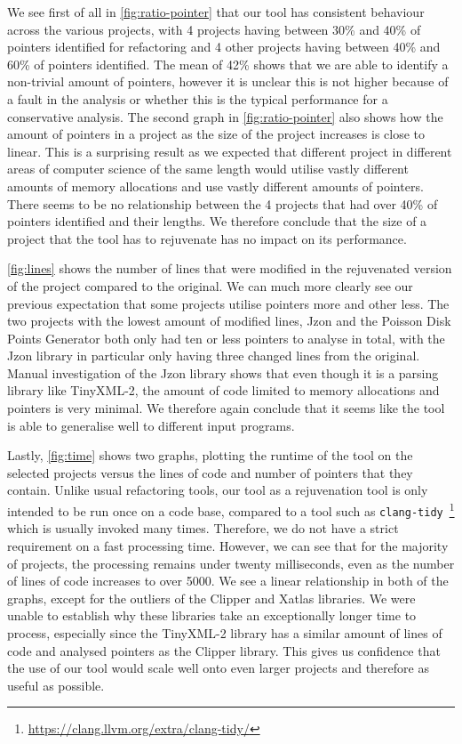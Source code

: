 \documentclass{mpaper}
\begin{document}
    We see first of all in \autoref{fig:ratio-pointer} that our tool has consistent behaviour across the various projects, with 4 projects having between 30\% and 40\% of pointers identified for refactoring and 4 other projects having between 40\% and 60\% of pointers identified. 
    The mean of 42\% shows that we are able to identify a non-trivial amount of pointers, however it is unclear this is not higher because of a fault in the analysis or whether this is the typical performance for a conservative analysis.
    The second graph in \autoref{fig:ratio-pointer} also shows how the amount of pointers in a project as the size of the project increases is close to linear. 
    This is a surprising result as we expected that different project in different areas of computer science of the same length would utilise vastly different amounts of memory allocations and use vastly different amounts of pointers.
    There seems to be no relationship between the 4 projects that had over 40\% of pointers identified and their lengths.
    We therefore conclude that the size of a project that the tool has to rejuvenate has no impact on its performance. 
    
    \autoref{fig:lines} shows the number of lines that were modified in the rejuvenated version of the project compared to the original. 
    We can much more clearly see our previous expectation that some projects utilise pointers more and other less. 
    The two projects with the lowest amount of modified lines, Jzon and the Poisson Disk Points Generator both only had ten or less pointers to analyse in total, with the Jzon library in particular only having three changed lines from the original. 
    Manual investigation of the Jzon library shows that even though it is a parsing library like TinyXML-2, the amount of code limited to memory allocations and pointers is very minimal. 
    We therefore again conclude that it seems like the tool is able to generalise well to different input programs.
    
    Lastly, \autoref{fig:time} shows two graphs, plotting the runtime of the tool on the selected projects versus the lines of code and number of pointers that they contain.
    Unlike usual refactoring tools, our tool as a rejuvenation tool is only intended to be run once on a code base, compared to a tool such as \texttt{clang-tidy}~\footnote{\url{https://clang.llvm.org/extra/clang-tidy/}} which is usually invoked many times. 
    Therefore, we do not have a strict requirement on a fast processing time. 
    However, we can see that for the majority of projects, the processing remains under twenty milliseconds, even as the number of lines of code increases to over 5000. 
    We see a linear relationship in both of the graphs, except for the outliers of the Clipper and Xatlas libraries.
    We were unable to establish why these libraries take an exceptionally longer time to process, especially since the TinyXML-2 library has a similar amount of lines of code and analysed pointers as the Clipper library. 
    This gives us confidence that the use of our tool would scale well onto even larger projects and therefore as useful as possible.
    
\end{document}
